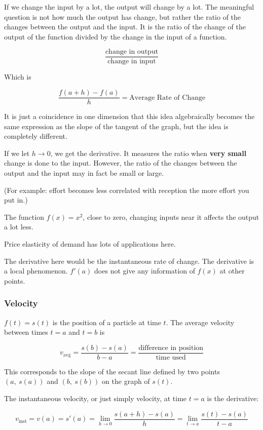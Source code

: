 \documentclass[
]{article}
\newcounter{example}
\begin{document}
If we change the input by a lot, the output will change by a lot. The
meaningful question is not how much the output has change, but rather
the ratio of the changes between the output and the input. It is the
ratio of the change of the output of the function divided by the change
in the input of a function.

$$\frac{\text{change\ in\ output}}{\text{change\ in\ input}}$$

Which is

$$\frac{f(a + h) - f(a)}{h} = \text{Average\ Rate\ of\ Change}$$

It is just a coincidence in one dimension that this idea algebraically
becomes the same expression as the slope of the tangent of the graph,
but the idea is completely different.

If we let $h \rightarrow 0$, we get the derivative. It measures the
ratio when \textbf{very small} change is done to the input. However, the
ratio of the changes between the output and the input may in fact be
small or large.

(For example: effort becomes less correlated with reception the more
effort you put in.)

The function $f(x) = x^{2}$, close to zero, changing inputs near it
affects the output a lot less.

Price elasticity of demand has lots of applications here.

The derivative here would be the instantaneous rate of change. The
derivative is a local phenomenon. $f'(a)$ does not give any
information of $f(x)$ at other points.


\subsubsection{Velocity}

$f(t) = s(t)$ is the position of a particle at time $t$. The average
velocity between times $t = a$ and $t = b$ is

$$v_{\text{avg}} = \frac{s(b) - s(a)}{b - a} = \frac{\text{difference\ in\ position}}{\text{time\ used}}$$

This corresponds to the slope of the secant line defined by two points
$\left( a,\ s(a) \right)$ and $\left( b,\ s(b) \right)$ on the graph
of $s(t)$.

The instantaneous velocity, or just simply velocity, at time $t = a$
is the derivative:

$$v_{\text{inst}} = v(a) = s'(a) = \lim_{h \rightarrow 0}\frac{s(a + h) - s(a)}{h} = \lim_{t \rightarrow a}\frac{s(t) - s(a)}{t - a}$$
\end{document}
